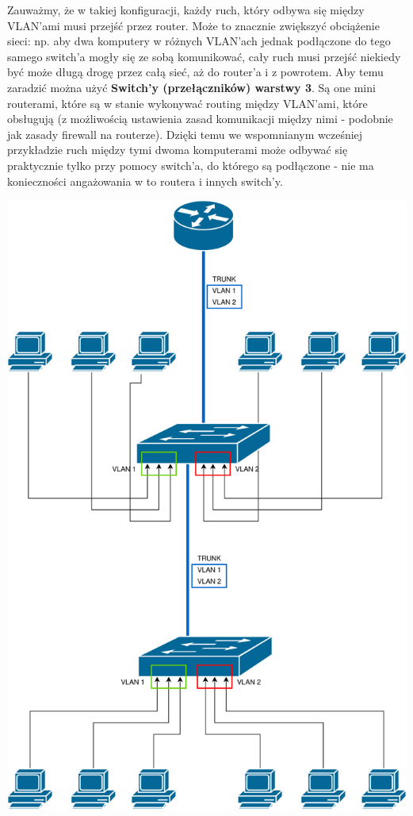 \documentclass[12pt]{article}
\begin{document}
    Zauważmy, że w takiej konfiguracji, każdy ruch, który odbywa się między VLAN'ami musi przejść przez router. Może to znacznie zwiększyć obciążenie sieci:
    np. aby dwa komputery w różnych VLAN'ach jednak podłączone do tego samego switch'a mogły się ze sobą komunikować, cały ruch musi przejść niekiedy być może
    długą drogę przez całą sieć, aż do router'a i z powrotem. Aby temu zaradzić można użyć \textbf{Switch'y (przełączników) warstwy 3}. Są one mini routerami,
    które są w stanie wykonywać routing między VLAN'ami, które obsługują (z możliwością ustawienia zasad komunikacji między nimi - podobnie jak zasady firewall na routerze).
    Dzięki temu we wspomnianym wcześniej przykładzie ruch między tymi dwoma komputerami może odbywać się praktycznie tylko przy pomocy switch'a, do którego są podłączone
    - nie ma konieczności angażowania w to routera i innych switch'y.

    \bigskip
    \includegraphics[width=\linewidth]{vlan/two_switches_and_router_with_trunk.png}
\end{document}
